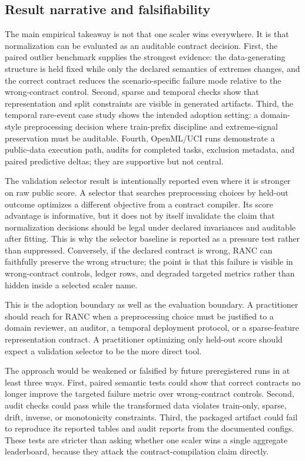 \documentclass{article}
\begin{document}
\subsection{Result narrative and falsifiability}

The main empirical takeaway is not that one scaler wins everywhere. It is that
normalization can be evaluated as an auditable contract decision. First, the
paired outlier benchmark supplies the strongest evidence: the data-generating
structure is held fixed while only the declared semantics of extremes changes,
and the correct contract reduces the scenario-specific failure mode relative to
the wrong-contract control. Second, sparse and temporal checks show that
representation and split constraints are visible in generated artifacts. Third,
the temporal rare-event case study shows the intended adoption setting: a
domain-style preprocessing decision where train-prefix discipline and
extreme-signal preservation must be auditable. Fourth, OpenML/UCI runs
demonstrate a public-data execution path, audits for completed tasks, exclusion
metadata, and paired predictive deltas; they are supportive but not central.

The validation selector result is intentionally reported even where it is
stronger on raw public score. A selector that searches preprocessing choices by
held-out outcome optimizes a different objective from a contract compiler. Its
score advantage is informative, but it does not by itself invalidate the claim
that normalization decisions should be legal under declared invariances and
auditable after fitting. This is why the selector baseline is reported as a
pressure test rather than suppressed. Conversely, if the declared contract is
wrong, RANC can faithfully preserve the wrong structure; the point is that this
failure is visible in wrong-contract controls, ledger rows, and degraded
targeted metrics rather than hidden inside a selected scaler name.

This is the adoption boundary as well as the evaluation boundary. A practitioner
should reach for RANC when a preprocessing choice must be justified to a domain
reviewer, an auditor, a temporal deployment protocol, or a sparse-feature
representation contract. A practitioner optimizing only held-out score should
expect a validation selector to be the more direct tool.

The approach would be weakened or falsified by future preregistered runs in at
least three ways. First, paired semantic tests could show that correct contracts
no longer improve the targeted failure metric over wrong-contract controls.
Second, audit checks could pass while the transformed data violates train-only,
sparse, drift, inverse, or monotonicity constraints. Third, the packaged
artifact could fail to reproduce its reported tables and audit reports from the
documented configs. These tests are stricter than asking whether one scaler wins
a single aggregate leaderboard, because they attack the contract-compilation
claim directly.
\end{document}
